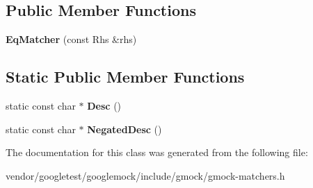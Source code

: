 \subsection*{Public Member Functions}
\begin{DoxyCompactItemize}
\item 
\mbox{\label{classtesting_1_1internal_1_1_eq_matcher_a9051e33bc31f413a3c958d04cc090b46}} 
{\bfseries Eq\+Matcher} (const Rhs \&rhs)
\end{DoxyCompactItemize}
\subsection*{Static Public Member Functions}
\begin{DoxyCompactItemize}
\item 
\mbox{\label{classtesting_1_1internal_1_1_eq_matcher_a3ddc72ceade061ad56debfa0a4dc2749}} 
static const char $\ast$ {\bfseries Desc} ()
\item 
\mbox{\label{classtesting_1_1internal_1_1_eq_matcher_ae99a542c124694d5b91793a2df9202dc}} 
static const char $\ast$ {\bfseries Negated\+Desc} ()
\end{DoxyCompactItemize}


The documentation for this class was generated from the following file\+:\begin{DoxyCompactItemize}
\item 
vendor/googletest/googlemock/include/gmock/gmock-\/matchers.\+h\end{DoxyCompactItemize}
